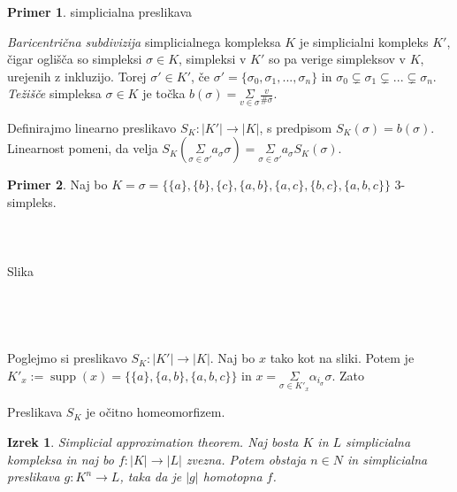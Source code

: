 \documentclass[a4paper,12pt]{article}
\DeclareMathOperator*{\supp}{supp}
\theoremstyle{definition}
\theoremstyle{plain}
\newtheorem{izrek}{Izrek}
\theoremstyle{definition}
\newtheorem{primer}{Primer}
\theoremstyle{plain}
\theoremstyle{plain}
\theoremstyle{plain}
\theoremstyle{plain}
\begin{document}
\begin{primer}
    simplicialna preslikava
\end{primer}
    
\textit{Baricentrična subdivizija} simplicialnega kompleksa 
$K$ je simplicialni kompleks $K'$, čigar oglišča so 
simpleksi $\sigma \in K$, simpleksi v $K'$ so pa verige 
simpleksov v $K$, urejenih z inkluzijo. Torej $\sigma' \in K'$, če $\sigma' = \{\sigma_0, \sigma_1,...,\sigma_n\}$ in $\sigma_0\subsetneq \sigma_1\subsetneq...\subsetneq\sigma_n$. \textit{Težišče} simpleksa $\sigma \in K$ je točka $b(\sigma)=\underset{v\in \sigma}{\Sigma} \frac{v}{\#\sigma}$.

Definirajmo linearno preslikavo $S_K: |K'| \rightarrow |K|$, s predpisom $S_K(\sigma) = b(\sigma)$. Linearnost pomeni, da velja $S_K(\underset{\sigma\in \sigma'}{\Sigma} a_\sigma \sigma) =  \underset{\sigma\in \sigma'}{\Sigma} a_\sigma S_K(\sigma).$

\begin{primer}
Naj bo $K=\sigma=\{\{a\},\{b\},\{c\},\{a,b\},\{a,c\},\{b,c\},\{a,b,c\}\}$ 3-simpleks.
\\
\\
\\
\\
Slika
\\
\\
\\
\\
\\
Poglejmo si preslikavo $S_K: |K'| \rightarrow |K|$. Naj bo $x$ tako kot na sliki. %
Potem je 
$K'_x:=\supp(x)=\{\{a\},\{a,b\},\{a,b,c\}\}$ in $x= \underset{\sigma\in K'_x}{\Sigma} \alpha_{i_\sigma} \sigma$. Zato

Preslikava $S_K$ je očitno homeomorfizem.



\end{primer}
\begin{izrek}
    \textit{Simplicial approximation theorem}. Naj bosta $K$ in $L$ simplicialna kompleksa in naj bo $f:|K| \rightarrow |L|$ zvezna. Potem obstaja $n\in N$ in simplicialna preslikava
    $g:K^n\rightarrow L$, taka da je $|g|$ homotopna $f$.
\end{izrek}
\end{document}

